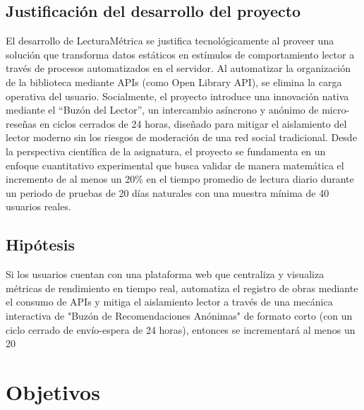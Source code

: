 \documentclass[12pt, atypical, journal]{article}
\begin{document}
\subsection{Justificación del desarrollo del proyecto}
El desarrollo de LecturaMétrica se justifica tecnológicamente al proveer una solución que transforma datos estáticos en estímulos de comportamiento lector a través de procesos automatizados en el servidor. Al automatizar la organización de la biblioteca mediante APIs (como Open Library API), se elimina la carga operativa del usuario. Socialmente, el proyecto introduce una innovación nativa mediante el ``Buzón del Lector'', un intercambio asíncrono y anónimo de micro-reseñas en ciclos cerrados de 24 horas, diseñado para mitigar el aislamiento del lector moderno sin los riesgos de moderación de una red social tradicional. Desde la perspectiva científica de la asignatura, el proyecto se fundamenta en un enfoque cuantitativo experimental que busca validar de manera matemática el incremento de al menos un 20\% en el tiempo promedio de lectura diario durante un periodo de pruebas de 20 días naturales con una muestra mínima de 40 usuarios reales.

\subsection{Hipótesis}
Si los usuarios cuentan con una plataforma web que centraliza y visualiza métricas de rendimiento en tiempo real, automatiza el registro de obras mediante el consumo de APIs y mitiga el aislamiento lector a través de una mecánica interactiva de "Buzón de Recomendaciones Anónimas" de formato corto (con un ciclo cerrado de envío-espera de 24 horas), entonces se incrementará al menos un 20%

\newpage

\section{Objetivos}
\end{document}
